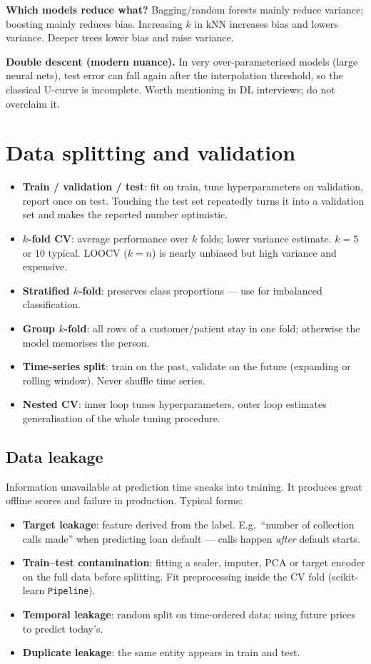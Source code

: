 \textbf{Which models reduce what?} Bagging/random forests mainly reduce variance; boosting mainly reduces bias. Increasing $k$ in kNN increases bias and lowers variance. Deeper trees lower bias and raise variance.

\textbf{Double descent (modern nuance).} In very over-parameterised models (large neural nets), test error can fall again after the interpolation threshold, so the classical U-curve is incomplete. Worth mentioning in DL interviews; do not overclaim it.

\section{Data splitting and validation}
\begin{itemize}
  \item \textbf{Train / validation / test}: fit on train, tune hyperparameters on validation, report once on test. Touching the test set repeatedly turns it into a validation set and makes the reported number optimistic.
  \item \textbf{$k$-fold CV}: average performance over $k$ folds; lower variance estimate. $k=5$ or $10$ typical. LOOCV ($k=n$) is nearly unbiased but high variance and expensive.
  \item \textbf{Stratified $k$-fold}: preserves class proportions --- use for imbalanced classification.
  \item \textbf{Group $k$-fold}: all rows of a customer/patient stay in one fold; otherwise the model memorises the person.
  \item \textbf{Time-series split}: train on the past, validate on the future (expanding or rolling window). Never shuffle time series.
  \item \textbf{Nested CV}: inner loop tunes hyperparameters, outer loop estimates generalisation of the whole tuning procedure.
\end{itemize}

\subsection{Data leakage}
Information unavailable at prediction time sneaks into training. It produces great offline scores and failure in production. Typical forms:
\begin{itemize}
  \item \textbf{Target leakage}: feature derived from the label. E.g.\ ``number of collection calls made'' when predicting loan default --- calls happen \emph{after} default starts.
  \item \textbf{Train--test contamination}: fitting a scaler, imputer, PCA or target encoder on the full data before splitting. Fit preprocessing inside the CV fold (scikit-learn \texttt{Pipeline}).
  \item \textbf{Temporal leakage}: random split on time-ordered data; using future prices to predict today's.
  \item \textbf{Duplicate leakage}: the same entity appears in train and test.
\end{itemize}

